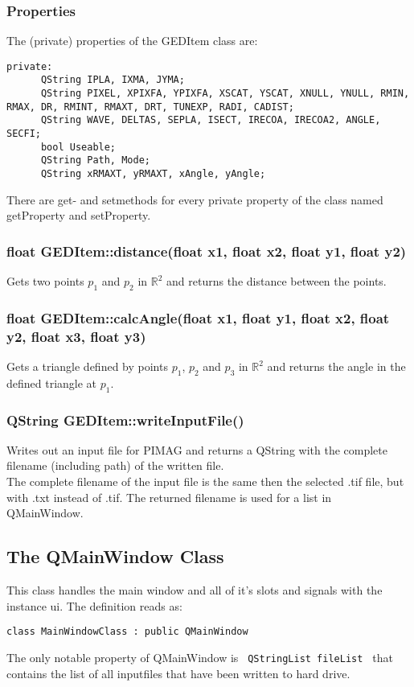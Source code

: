 \subsubsection{Properties} 
 The (private) properties of the GEDItem class are: 
\begin{lstlisting}
private: 
      QString IPLA, IXMA, JYMA;
      QString PIXEL, XPIXFA, YPIXFA, XSCAT, YSCAT, XNULL, YNULL, RMIN, RMAX, DR, RMINT, RMAXT, DRT, TUNEXP, RADI, CADIST;
      QString WAVE, DELTAS, SEPLA, ISECT, IRECOA, IRECOA2, ANGLE, SECFI;
      bool Useable;
      QString Path, Mode;
      QString xRMAXT, yRMAXT, xAngle, yAngle;
\end{lstlisting}
There are get- and setmethods for every private property of the class named getProperty and setProperty. 
\subsubsection{float GEDItem::distance(float x1, float x2, float y1, float y2)} 
Gets two points $p_1$ and $p_2$ in $\mathbb{R}^2$ and returns the distance between the points. 

\subsubsection{float GEDItem::calcAngle(float x1, float y1, float x2, float y2, float x3, float y3)}
Gets a triangle defined by points $p_1$, $p_2$ and $p_3$ in $\mathbb{R}^2$ and returns the angle in the defined triangle at $p_1$. 

\subsubsection{QString GEDItem::writeInputFile()}
Writes out an input file for PIMAG \cite{pimag} and returns a QString with the complete filename (including path) of the written file. \\
The complete filename of the input file is the same then the selected .tif file, but with .txt instead of .tif.  The returned filename is used for a list in QMainWindow. \\

\newpage

\subsection{The QMainWindow Class} 
This class handles the main window and all of it's slots and signals with the instance ui. The definition reads as:
\begin{lstlisting}
class MainWindowClass : public QMainWindow
\end{lstlisting}
The only notable property of QMainWindow is \lstinline$ QStringList fileList $ that contains the list of all inputfiles that have been written to hard drive. 

